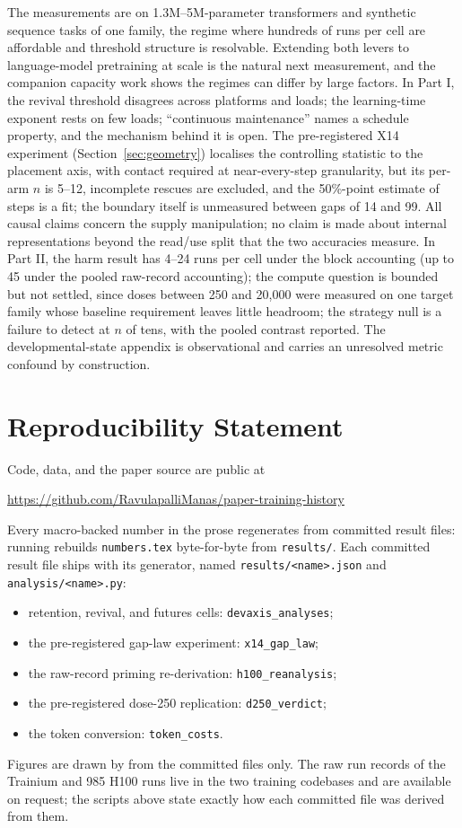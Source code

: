 \documentclass{article}
\begin{document}
The measurements are on 1.3M--5M-parameter transformers and synthetic sequence tasks of one
family, the regime where hundreds of runs per cell are affordable and threshold structure is
resolvable. Extending both levers to language-model pretraining at scale is the natural next
measurement, and the companion capacity work shows the regimes can differ by large factors. In Part I, the revival threshold disagrees across platforms and loads; the
learning-time exponent rests on few loads; ``continuous maintenance'' names a schedule
property, and the mechanism behind it is open. The pre-registered X14 experiment
(Section~\ref{sec:geometry}) localises the controlling statistic to the placement axis, with
contact required at near-every-step granularity, but its per-arm $n$ is 5--12,
\GapIncomplete{} incomplete rescues are excluded, and the 50\%-point estimate of \GapFifty{}
steps is a fit; the boundary itself is unmeasured between gaps of 14 and 99. All causal
claims concern the supply manipulation; no claim is made about internal representations
beyond the read/use split that the two accuracies measure. In Part II, the harm result has
4--24 runs per cell under the block accounting (up to 45 under the pooled raw-record
accounting); the compute question is bounded but not settled, since doses between 250 and
20{,}000 were measured on one target family whose baseline requirement leaves little
headroom; the strategy null is a failure to detect at $n$ of tens, with the pooled contrast
reported. The developmental-state appendix is observational and carries an unresolved metric
confound by construction.

\section*{Reproducibility Statement}
Code, data, and the paper source are public at
\begin{center}
\url{https://github.com/RavulapalliManas/paper-training-history}
\end{center}
\noindent Every macro-backed number in the prose regenerates from committed result files:
running  rebuilds \texttt{numbers.tex} byte-for-byte
from \texttt{results/}. Each committed result file ships with its generator, named
\texttt{results/<name>.json} and \texttt{analysis/<name>.py}:
\begin{itemize}
\item retention, revival, and futures cells: \texttt{devaxis\_analyses};
\item the pre-registered gap-law experiment: \texttt{x14\_gap\_law};
\item the raw-record priming re-derivation: \texttt{h100\_reanalysis};
\item the pre-registered dose-250 replication: \texttt{d250\_verdict};
\item the token conversion: \texttt{token\_costs}.
\end{itemize}
Figures are drawn by  from the committed files only.
The raw run records of the \DevaxisRuns{} Trainium and 985 H100 runs live in the two
training codebases and are available on request; the scripts above state exactly how each
committed file was derived from them.
\end{document}
